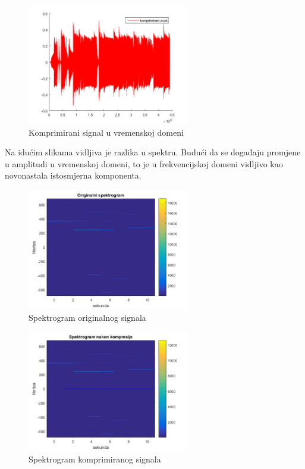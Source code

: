 \documentclass[conference]{IEEEtran}
\begin{document}
\begin{figure}[H]
    \includegraphics[width=200pt]{slike/def_kompr.jpg}
    \centering
    \caption{Komprimirani signal u vremenskoj domeni}							%
    \label{komp_vrijeme}
\end{figure}

Na idućim slikama vidljiva je razlika u spektru. Budući da se događaju promjene u amplitudi u vremenskoj domeni,
to je u frekvencijskoj domeni vidljivo kao novonastala istosmjerna komponenta.

\begin{figure}[H]
    \includegraphics[width=200pt]{slike/originalni_spektrogram.jpg}
    \centering
    \caption{Spektrogram originalnog signala}
    \label{komp_ulaz_spektar}
\end{figure}

\begin{figure}[H]
    \includegraphics[width=200pt]{slike/spektrogram_nakon_kompresije.jpg}
    \centering
    \caption{Spektrogram komprimiranog signala}							%
    \label{komp_spektar}
\end{figure}
\end{document}
